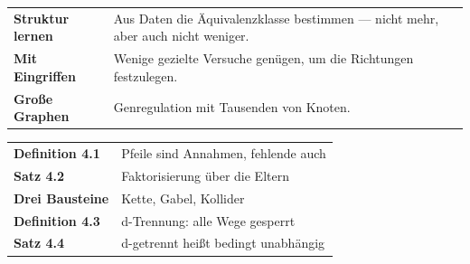 \begin{forschung}
\begin{center}
{\small
\renewcommand{\arraystretch}{1.45}
\begin{tabular}{@{}P{2.8cm}P{5.4cm}@{}}
\toprule
\textbf{Struktur lernen} & Aus Daten die Äquivalenzklasse bestimmen --- nicht mehr, aber auch nicht weniger.\\
\textbf{Mit Eingriffen} & Wenige gezielte Versuche genügen, um die Richtungen festzulegen.\\
\textbf{Große Graphen} & Genregulation mit Tausenden von Knoten.\\
\bottomrule
\end{tabular}}
\end{center}

\begin{center}
\begin{minipage}{0.88\textwidth}
\end{minipage}
\end{center}
\end{forschung}

\begin{merksatz}
\begin{center}
\renewcommand{\arraystretch}{1.5}
\begin{tabular}{@{}P{3.0cm}P{5.6cm}@{}}
\toprule
\textbf{Definition 4.1} & Pfeile sind Annahmen, fehlende auch\\
\textbf{Satz 4.2} & Faktorisierung über die Eltern\\
\textbf{Drei Bausteine} & Kette, Gabel, Kollider\\
\textbf{Definition 4.3} & d-Trennung: alle Wege gesperrt\\
\textbf{Satz 4.4} & d-getrennt heißt bedingt unabhängig\\
\bottomrule
\end{tabular}
\end{center}

\begin{center}
\begin{minipage}{0.88\textwidth}
\end{minipage}
\end{center}
\end{merksatz}
